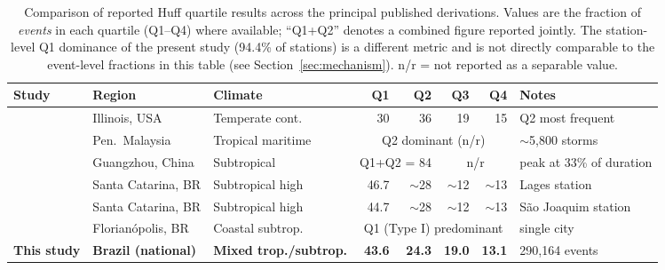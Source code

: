 \documentclass[a4paper,fleqn]{cas-sc}
\begin{document}
\begin{table}[!t]
  \centering
  \caption{Comparison of reported Huff quartile results across the
    principal published derivations. Values are the fraction of
    \emph{events} in each quartile (Q1–Q4) where available; ``Q1+Q2''
    denotes a combined figure reported jointly. The station-level Q1
    dominance of the present study (94.4\% of stations) is a different
    metric and is not directly comparable to the event-level fractions
    in this table (see Section~\ref{sec:mechanism}). n/r = not reported
    as a separable value.}
  \label{tab:comparison}
  \setlength{\tabcolsep}{4pt}
  \begin{tabular}{lllrrrrl}
    \toprule
    Study & Region & Climate & Q1 & Q2 & Q3 & Q4 & Notes \\
    \midrule
    \citet{Huff1967}        & Illinois, USA      & Temperate cont.\ &
      30 & 36 & 19 & 15 & Q2 most frequent \\
    \citet{AzliRao2010}     & Pen.\ Malaysia     & Tropical maritime &
      \multicolumn{4}{c}{Q2 dominant (n/r)} & $\sim$5{,}800 storms \\
    \citet{Liang2017}       & Guangzhou, China   & Subtropical &
      \multicolumn{2}{c}{Q1+Q2 = 84} & \multicolumn{2}{c}{n/r} &
      peak at 33\% of duration \\
    \citet{SantaCatarina2021} & Santa Catarina, BR & Subtropical high &
      46.7 & $\sim$28 & $\sim$12 & $\sim$13 & Lages station \\
    \citet{SantaCatarina2021} & Santa Catarina, BR & Subtropical high &
      44.7 & $\sim$28 & $\sim$12 & $\sim$13 & São Joaquim station \\
    \citet{Florianopolis2021} & Florianópolis, BR & Coastal subtrop.\ &
      \multicolumn{4}{c}{Q1 (Type I) predominant} & single city \\
    \textbf{This study}     & \textbf{Brazil (national)} &
      \textbf{Mixed trop./subtrop.} &
      \textbf{43.6} & \textbf{24.3} & \textbf{19.0} & \textbf{13.1} &
      290{,}164 events \\
    \bottomrule
  \end{tabular}
\end{table}

\end{document}

